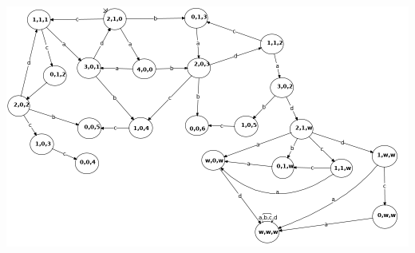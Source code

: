 \documentclass[a4paper,12pt]{scrartcl}
\title{\blatt}
\date{Gruppe 06}
\author{Sabrina Buczko 6663234, Julian Deinert 6535880, Rafael Heid 6704828}
\begin{document}
\maketitle
\newpage
\setcounter{section}{8}
\section{}
\setcounter{subsection}{2}
\subsection{}
\subsubsection{}
\includegraphics[scale=0.5]{netz.png}
\newpage
\subsection{}
\end{document}

